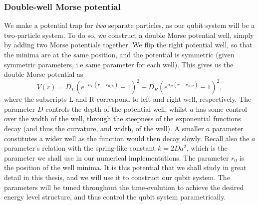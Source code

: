 \documentclass{subfiles}
\begin{document}
\subsubsection*{Double-well Morse potential}\label{sec:double_well_morse_potential}
We make a potential trap for \emph{two} separate particles, as our qubit system will be a two-particle system. To do so, we construct a double Morse potential well, simply by adding two Morse potentials together. We flip the right potential well, so that the minima are at the same position, and the potential is symmetric (given symmetric parameters, i.e same parameter for each well). This gives us the double Morse potential as
\begin{equation}
    V(r) = D_L(e^{-a_L(r-r_{0,L})} - 1)^2 + D_R(e^{a_R(r-r_{0,R})} - 1)^2\label{eq:double_well_morse_potential},
\end{equation}
where the subscripts L and R correspond to left and right well, respectively. The parameter $D$ controls the depth of the potential well, whilst $a$ has some control over the width of the well, through the steepness of the exponential functions decay (and thus the curvature, and width, of the well). A smaller $a$ parameter constitutes a wider well as the function would then decay slowly. Recall also the $a$ parameter's relation with the spring-like constant $k=2Da^2$, which is the parameter we shall use in our numerical implementations. The parameter $r_0$ is the position of the well minima. It is this potential that we shall study in great detail in this thesis, and we will use it to construct our qubit system. The parameters will be tuned throughout the time-evolution to achieve the desired energy level structure, and thus control the qubit system parametrically.
\end{document}

